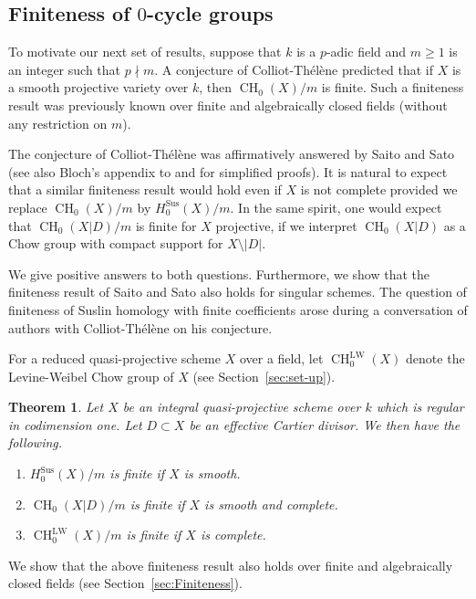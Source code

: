 \documentclass[JEP,XML,SOM,Unicode,published]{cedram}
\newcommand{\LW}{\mathrm{LW}}
\newcommand{\sus}{\mathrm{Sus}}
\newtheorem{thm}{Theorem}[section]
\theoremstyle{definition}
\newcommand{\secref}{Section~\ref}
\DeclareMathOperator{\CH}{CH}
\begin{document}
\subsection{Finiteness of $0$-cycle groups}\label{sec:FF}
To motivate our next set of results, suppose that
$k$ is a $p$-adic field and $m \ge 1$ is an integer such that $p \nmid m$. A
conjecture of Colliot-Thélène predicted that if $X$ is a smooth projective
variety over $k$, then ${\CH_0(X)}/m$ is finite.
Such a finiteness result was previously known over finite and algebraically closed
fields (without any restriction on $m$).

The conjecture of Colliot-Thélène was affirmatively answered by
Saito and Sato~\cite{SaitoSatoAnnals} (see also Bloch's appendix to
\cite{EsnaultWittenberg} and
\cite{EKW} for simplified proofs).
It is natural to expect that a similar finiteness result would hold even if
$X$ is not complete provided we replace
${\CH_0(X)}/m$ by ${H^{\sus}_0(X)}/m$.
In the same spirit, one would expect that ${\CH_0(X|D)}/m$ is finite for $X$
projective, if we interpret ${\CH_0(X|D)}$ as a Chow group with compact support for
$X \setminus |D|$.

We give positive answers to both questions. Furthermore, we show that the finiteness
result of Saito and Sato also holds for singular schemes.
The question of finiteness of Suslin homology with finite coefficients arose during a
conversation of authors with Colliot-Thélène on his
conjecture.

For a reduced quasi-projective scheme $X$ over a field, let $\CH^{\LW}_0(X)$ denote the
Levine-Weibel Chow group of $X$ (see \secref{sec:set-up}).

\begin{thm}\label{thm:Main-4}
Let $X$ be an integral quasi-projective scheme over $k$ which is regular
in codimension one. Let $D \subset X$ be an effective Cartier divisor.
We then have the following.
\begin{enumerate}
\item\label{thm:Main-41}
${H^{\sus}_0(X)}/m$ is finite if $X$ is smooth.
\item\label{thm:Main-42}
${\CH_0(X|D)}/m$ is finite if $X$ is smooth and complete.
\item\label{thm:Main-43}
${\CH^{\LW}_0(X)}/m$ is finite if $X$ is complete.
\end{enumerate}
\end{thm}

We show that the above finiteness result also holds over finite and
algebraically closed fields (see \secref{sec:Finiteness}).
\end{document}
